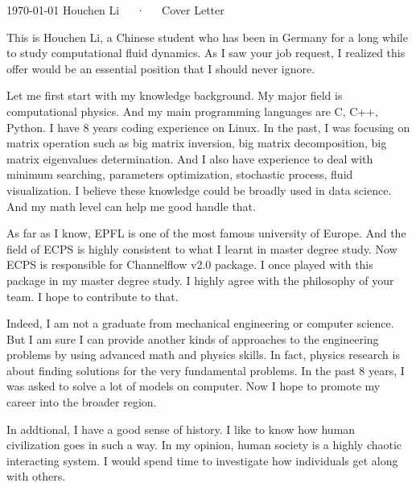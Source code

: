 \documentclass[11pt, a4paper]{awesome-cv}
\begin{document}
\makecvheader[R]

\makecvfooter
  {\today}
  {Houchen Li~~~·~~~Cover Letter}
  {}

\makelettertitle

\begin{cvletter}

This is Houchen Li, a Chinese student who has been in Germany for a long while to study computational fluid dynamics. As I saw your job request, I realized this offer would be an essential position that I should never ignore.

Let me first start with my knowledge background. My major field is computational physics. And my main programming languages are C, C++, Python. I have 8 years coding experience on Linux. In the past, I was focusing on matrix operation such as big matrix inversion, big matrix decomposition, big matrix eigenvalues determination. And I also have experience to deal with minimum searching, parameters optimization, stochastic process, fluid visualization. I believe these knowledge could be broadly used in data science. And my math level can help me good handle that.

As far as I know, EPFL is one of the most famous university of Europe. And the field of ECPS is highly consistent to what I learnt in master degree study. Now ECPS is responsible for Channelflow v2.0 package. I once played with this package in my master degree study. I highly agree with the philosophy of your team. I hope to contribute to that.

Indeed, I am not a graduate from mechanical engineering or computer science. But I am sure I can provide another kinds of approaches to the engineering problems by using advanced math and physics skills. In fact, physics research is about finding solutions for the very fundamental problems. In the past 8 years, I was asked to solve a lot of models on computer. Now I hope to promote my career into the broader region.

In addtional, I have a good sense of history. I like to know how human civilization goes in such a way. In my opinion, human society is a highly chaotic interacting system. I would spend time to investigate how individuals get along with others.


\end{cvletter}


\makeletterclosing
\end{document}
